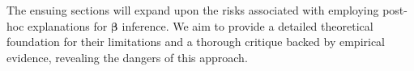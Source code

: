 \documentclass[mnsc,blindrev]{informs3}
\begin{document}
The ensuing sections will expand upon the risks associated with employing post-hoc explanations for $\boldsymbol{\beta}$ inference. We aim to provide a detailed theoretical foundation for their limitations and a thorough critique backed by empirical evidence, revealing the dangers of this approach.


     
\end{document}
